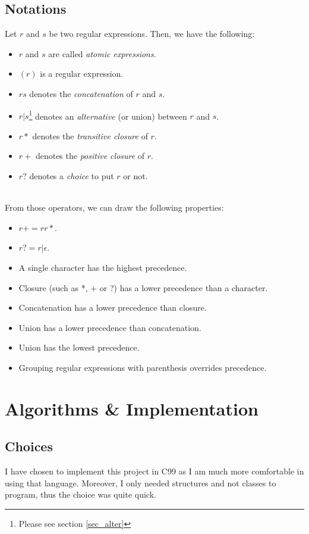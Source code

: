 \documentclass[a4paper,11pt,titlepage]{article}
\begin{document}
\subsection{Notations}
Let $r$ and $s$ be two regular expressions. Then, we have the following:
\begin{itemize}
    \item $r$ and $s$ are called \textit{atomic expressions}.
    \item $(r)$ is a regular expression.
    \item $rs$ denotes the \textit{concatenation} of $r$ and $s$.
    \item $r|s$\footnote{Please see section \ref{sec_alter}} denotes an \textit{alternative} (or union) between $r$ and $s$.
    \item $r*$ denotes the \textit{transitive closure} of $r$.
    \item $r+$ denotes the \textit{positive closure} of $r$.
    \item $r?$ denotes a \textit{choice} to put $r$ or not. 
\end{itemize}
\;\\
From those operators, we can draw the following properties:
\begin{itemize} \label{sec_properties}
    \item $r+=rr*$.
    \item $r?=r|\epsilon$.
    \item A single character has the highest precedence.
    \item Closure (such as *, + or ?) has a lower precedence than a character.
    \item Concatenation has a lower precedence than closure.
    \item Union has a lower precedence than concatenation.
    \item Union has the lowest precedence.
    \item Grouping regular expressions with parenthesis overrides precedence.
\end{itemize}

\section{Algorithms \& Implementation}
\subsection{Choices}
I have chosen to implement this project in C99 as I am much more comfortable in using that language. Moreover, I only needed structures and not classes to program, thus the choice was quite quick.
\end{document}
